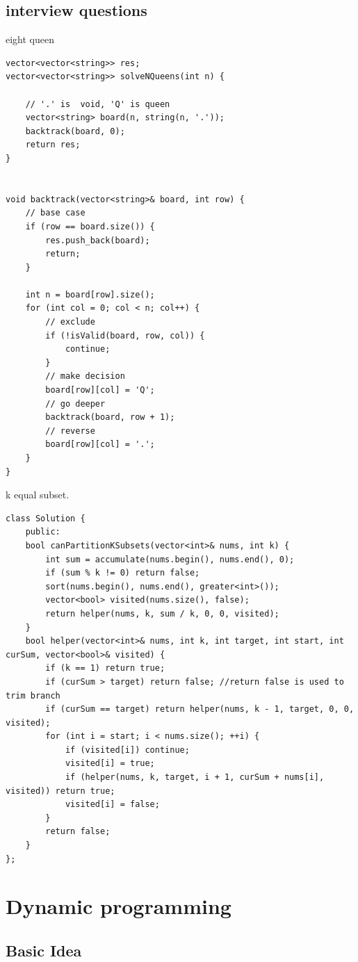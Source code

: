 \documentclass[a4paper,11pt,twoside]{book}
\begin{document}
\subsection{interview questions}

	\par eight queen
	
\begin{lstlisting}
vector<vector<string>> res;
vector<vector<string>> solveNQueens(int n) {
	
	// '.' is  void, 'Q' is queen
	vector<string> board(n, string(n, '.'));
	backtrack(board, 0);
	return res;
}


void backtrack(vector<string>& board, int row) {
	// base case
	if (row == board.size()) {
		res.push_back(board);
		return;
	}
	
	int n = board[row].size();
	for (int col = 0; col < n; col++) {
		// exclude
		if (!isValid(board, row, col)) {
			continue;
		}
		// make decision
		board[row][col] = 'Q';
		// go deeper
		backtrack(board, row + 1);
		// reverse
		board[row][col] = '.';
	}
}	
\end{lstlisting}	
	


	\par k equal subset.
	
\begin{lstlisting}
class Solution {
	public:
	bool canPartitionKSubsets(vector<int>& nums, int k) {
		int sum = accumulate(nums.begin(), nums.end(), 0);
		if (sum % k != 0) return false;
		sort(nums.begin(), nums.end(), greater<int>());
		vector<bool> visited(nums.size(), false);
		return helper(nums, k, sum / k, 0, 0, visited);
	}
	bool helper(vector<int>& nums, int k, int target, int start, int curSum, vector<bool>& visited) {
		if (k == 1) return true;
		if (curSum > target) return false; //return false is used to trim branch
		if (curSum == target) return helper(nums, k - 1, target, 0, 0, visited);  
		for (int i = start; i < nums.size(); ++i) {
			if (visited[i]) continue;
			visited[i] = true;
			if (helper(nums, k, target, i + 1, curSum + nums[i], visited)) return true;
			visited[i] = false;
		}
		return false;
	}
};	
\end{lstlisting}	
	

\section{Dynamic programming}
\subsection{Basic Idea}
	
\end{document}
